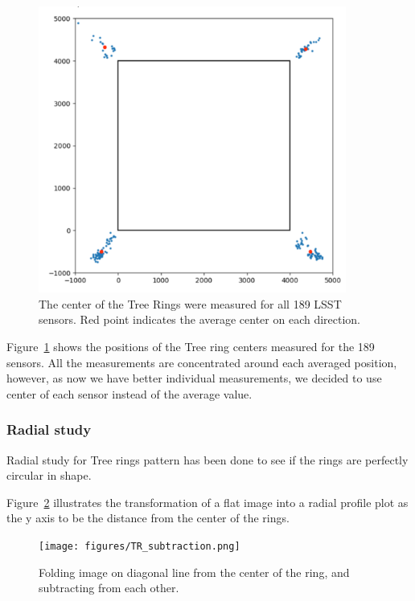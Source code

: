 \begin{figure}[ht]
\begin{centering}
\includegraphics[width=0.9\textwidth]{figures/TR_centers.png}
\end{centering}
\caption{The center of the Tree Rings were measured for all 189 LSST sensors. Red point indicates the average center on each direction.}
\label{fig:tree_ring_center}
\end{figure}
Figure~\ref{fig:tree_ring_center} shows the positions of the Tree ring centers measured for the 189 sensors. All the measurements are concentrated around each averaged position, however, as now we have better individual measurements, we decided to use center of each sensor instead of the average value. 


\subsubsection{Radial study}
Radial study for Tree rings pattern has been done to see if the rings are perfectly circular in shape. 

Figure~\ref{fig:tree-ring-radial-transform} illustrates the transformation of a flat image into a radial profile plot as the y axis to be the distance from the center of the rings. 

\begin{figure}[ht]
\centering
\texttt{[image: figures/TR\_subtraction.png]}
\caption{Folding image on diagonal line from the center of the ring, and subtracting from each other.}
\label{fig:tree-ring-radial-transform}
\end{figure}

